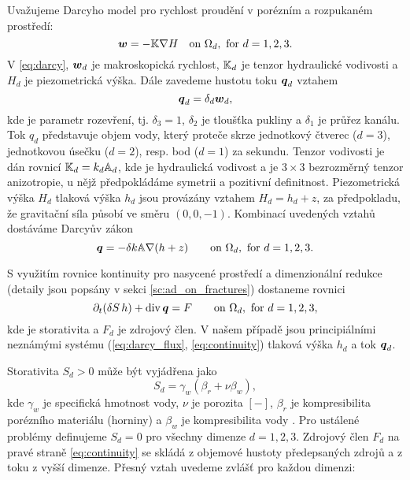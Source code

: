

Uvažujeme Darcyho model pro rychlost proudění v porézním a rozpukaném prostředí:
\begin{equation}
    \label{eq:darcy}
    \mathbf{\boldsymbol{w}} = -{\mathbb{K}} \nabla H \quad\text{on }\Omega_d,\ \text{for $d=1,2,3$}.
\end{equation}
V \eqref{eq:darcy}, $\mathbf{\boldsymbol{w}}_d$  je makroskopická rychlost,
${\mathbb{K}}_d$ je tenzor hydraulické vodivosti a $H_d$  je piezometrická výška. Dále zavedeme hustotu toku $\mathbf{\boldsymbol{q}}_d$ 
  vztahem
\[
    \mathbf{\boldsymbol{q}}_d = \delta_d \mathbf{\boldsymbol{w}}_d,
\]
kde
 je parametr rozevření, tj. $\delta_3=1$, $\delta_2$  je tloušťka pukliny a $\delta_1$  je průřez kanálu.
Tok $q_d$ představuje objem vody, který proteče skrze jednotkový čtverec ($d=3$),
jednotkovou úsečku ($d=2$), resp. bod ($d=1$) za sekundu. 
Tenzor vodivosti je dán rovnicí 
${\mathbb{K}}_d = k_d {\mathbb{A}}_d$, kde
 je hydraulická vodivost  a
 je
$3\times 3$ bezrozměrný tenzor anizotropie, u nějž předpokládáme symetrii a pozitivní definitnost. Piezometrická výška $H_d$ tlaková výška
$h_d$ jsou provázány vztahem $H_d = h_d + z$, za předpokladu, že gravitační síla působí ve směru $(0,0,-1)$. 
Kombinací uvedených vztahů dostáváme Darcyův zákon
\begin{equation}
    \label{eq:darcy_flux}
    \vc q = -\delta k\tn A \grad (h+z)  \qquad\text{on }\Omega_d,\ \text{for $d=1,2,3$}.
\end{equation}

S využitím rovnice kontinuity pro nasycené prostředí a dimenzionální redukce (detaily jsou popsány v sekci \ref{sc:ad_on_fractures}) dostaneme rovnici
\begin{equation}
    \label{eq:continuity}
    \prtl_t (\delta S\, h) + \div \vc q = F \qquad \text{on }\Omega_d,\ \text{for $d=1,2,3$},
\end{equation}
kde   je storativita a $F_d$  je zdrojový člen. V našem případě jsou principiálními neznámými systému
(\ref{eq:darcy_flux}, \ref{eq:continuity}) tlaková výška $h_d$ a tok $\mathbf{\boldsymbol{q}}_d$.


Storativita $S_d>0$ může být vyjádřena jako
\begin{equation}
  S_d = \gamma_w(\beta_r + \nu \beta_w),
\end{equation}
kde $\gamma_w$  je specifická hmotnost vody, $\nu$ je porozita $[-]$, $\beta_r$ je kompresibilita porézního materiálu (horniny)
a $\beta_w$ je kompresibilita vody . Pro ustálené problémy definujeme $S_d=0$ pro všechny dimenze $d=1,2,3$.
Zdrojový člen $F_d$ na pravé straně \eqref{eq:continuity} se skládá z objemové hustoty předepsaných zdrojů
  a z toku z vyšší dimenze. 
Přesný vztah uvedeme zvlášť pro každou dimenzi:

